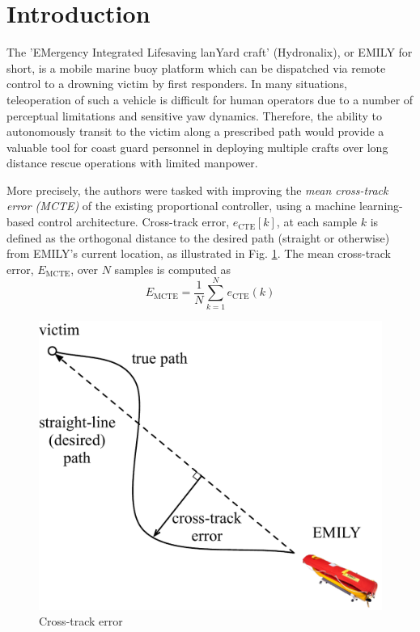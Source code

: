 \documentclass[conference]{IEEEtran}
\newcommand{\mcte}{E_{\text{MCTE}}}
\newcommand{\cte}{e_{\text{CTE}}}
\begin{document}
\IEEEpeerreviewmaketitle

\section{Introduction}
The 'EMergency Integrated Lifesaving lanYard craft' (Hydronalix), or EMILY for short, is a mobile marine buoy platform which can be dispatched via remote control to a drowning victim by first responders. In many situations, teleoperation of such a vehicle is difficult for human operators due to a number of perceptual limitations and sensitive yaw dynamics. Therefore, the ability to autonomously transit to the victim along a prescribed path would provide a valuable tool for coast guard personnel in deploying multiple crafts over long distance rescue operations with limited manpower.

More precisely, the authors were tasked with improving the \textit{mean cross-track error (MCTE)} of the existing proportional controller, using a machine learning-based control architecture. Cross-track error, $\cte[k]$, at each sample $k$ is defined as the orthogonal distance to the desired path (straight or otherwise) from EMILY's current location, as illustrated in Fig. \ref{fig:xte}. The mean cross-track error, $\mcte$, over $N$ samples is computed as
\begin{equation}
  \mcte = \frac{1}{N} \sum\limits_{k=1}^N \cte(k)
\end{equation}

\begin{figure}[h]
  \centering
  \includegraphics[scale=0.35]{figs/xte.pdf}
  \caption{Cross-track error}
  \label{fig:xte}
\end{figure}
\end{document}
